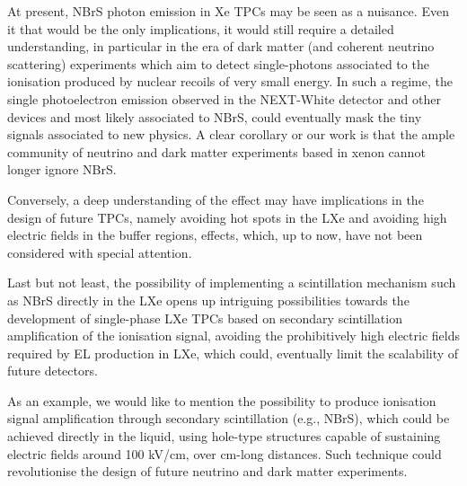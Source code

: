 \documentclass[%
 reprint,
superscriptaddress,
 amsmath,amssymb,
 aps,
]{revtex4-2}
\begin{document}
At present, NBrS photon emission in Xe TPCs may be seen as a nuisance. Even it that would be the only implications, it would still require a detailed understanding, in particular in the era of dark matter (and coherent neutrino scattering) experiments which aim to detect single-photons associated to the ionisation produced by nuclear recoils of very small energy. In such a regime, the single photoelectron emission observed in the NEXT-White detector and other devices and most likely associated to NBrS, could eventually mask the tiny signals associated to new physics. A clear corollary or our work is that the ample community of neutrino and dark matter experiments based in xenon cannot longer ignore NBrS. 

Conversely, a deep understanding of the effect may  have implications in the design of future TPCs, namely avoiding hot spots in the LXe and avoiding high electric fields in the buffer regions, effects, which, up to now, have not been considered with special attention.  

Last but not least, the possibility of implementing a scintillation mechanism such as NBrS directly in the LXe opens up intriguing possibilities towards the development of single-phase LXe TPCs based on secondary scintillation amplification of the ionisation signal, avoiding the prohibitively high electric fields required by EL production in LXe, which could, eventually limit the scalability of future detectors.  

As an example, we would like to mention the possibility to produce ionisation signal amplification through secondary scintillation (e.g., NBrS), which could be achieved directly in the liquid, using hole-type structures capable of sustaining electric fields around 100 kV/cm, over cm-long distances. Such technique could revolutionise the design of future neutrino and dark matter experiments.
\end{document}
